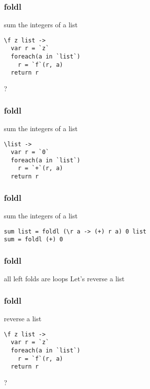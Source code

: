 \begin{frame}[fragile]
\frametitle{foldl}
\begin{block}{sum the integers of a list}
\begin{lstlisting}[style=haskell,basicstyle=\scriptsize\ttfamily,mathescape]
\f z list ->
  var r = `z`
  foreach(a in `list`)
    r = `f`(r, a)
  return r
\end{lstlisting}
\end{block}
\begin{center}
\LARGE
?
\end{center}
\end{frame}

\begin{frame}[fragile]
\frametitle{foldl}
\begin{block}{sum the integers of a list}
\begin{lstlisting}[style=haskell,basicstyle=\scriptsize\ttfamily,mathescape]
\list ->
  var r = `0`
  foreach(a in `list`)
    r = `+`(r, a)
  return r
\end{lstlisting}
\end{block}
\end{frame}

\begin{frame}[fragile]
\frametitle{foldl}
\begin{block}{sum the integers of a list}
\begin{lstlisting}[style=haskell,basicstyle=\scriptsize\ttfamily,mathescape]
sum list = foldl (\r a -> (+) r a) 0 list
sum = foldl (+) 0
\end{lstlisting}
\end{block}
\end{frame}

\begin{frame}[fragile]
\frametitle{foldl}
\begin{block}{all left folds are loops}
Let's reverse a list
\end{block}
\end{frame}

\begin{frame}[fragile]
\frametitle{foldl}
\begin{block}{reverse a list}
\begin{lstlisting}[style=haskell,basicstyle=\scriptsize\ttfamily,mathescape]
\f z list ->
  var r = `z`
  foreach(a in `list`)
    r = `f`(r, a)
  return r
\end{lstlisting}
\end{block}
\begin{center}
\LARGE
?
\end{center}
\end{frame}

